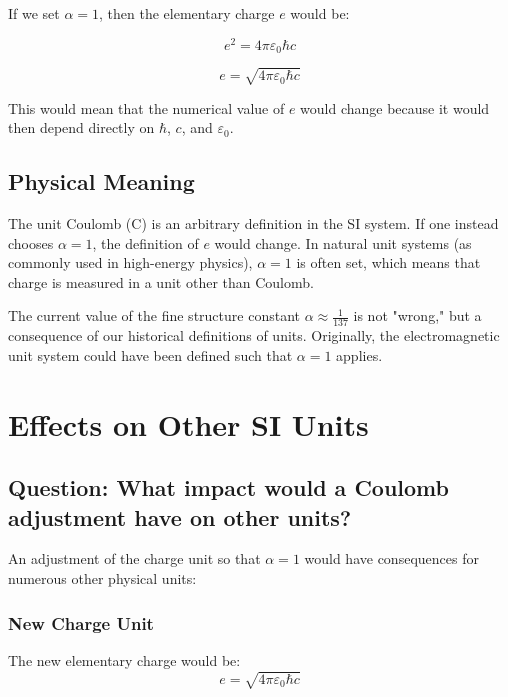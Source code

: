 \documentclass{article}
\begin{document}
If we set $\alpha = 1$, then the elementary charge $e$ would be:

\begin{equation}
	e^2 = 4\pi\varepsilon_0\hbar c
\end{equation}

\begin{equation}
	e = \sqrt{4\pi\varepsilon_0\hbar c}
\end{equation}

This would mean that the numerical value of $e$ would change because it would then depend directly on $\hbar$, $c$, and $\varepsilon_0$.

\subsection{Physical Meaning}

The unit Coulomb (C) is an arbitrary definition in the SI system. If one instead chooses $\alpha = 1$, the definition of $e$ would change. In natural unit systems (as commonly used in high-energy physics), $\alpha = 1$ is often set, which means that charge is measured in a unit other than Coulomb.

The current value of the fine structure constant $\alpha \approx \frac{1}{137}$ is not "wrong," but a consequence of our historical definitions of units. Originally, the electromagnetic unit system could have been defined such that $\alpha = 1$ applies.

\section{Effects on Other SI Units}

\subsection{Question: What impact would a Coulomb adjustment have on other units?}

An adjustment of the charge unit so that $\alpha = 1$ would have consequences for numerous other physical units:

\subsubsection{New Charge Unit}
The new elementary charge would be:
\begin{equation}
	e = \sqrt{4\pi\varepsilon_0\hbar c}
\end{equation}
\end{document}
